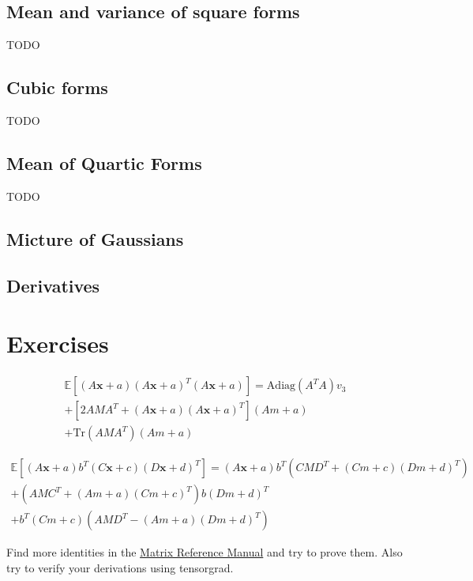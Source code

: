 \subsection{Mean and variance of square forms}
TODO
\subsection{Cubic forms}
TODO
\subsection{Mean of Quartic Forms}
TODO
\subsection{Micture of Gaussians}
\subsection{Derivatives}

\section{Exercises}
\begin{exercise}
   \begin{align*}
   \mathbb{E}[(A\mathbf{x} + a)(A\mathbf{x} + a)^T (A\mathbf{x} + a)] = 
   \text{Adiag}(A^T A) v_3 \\
   + [2 AMA^T + (A\mathbf{x} + a)(A\mathbf{x} + a)^T] (Am + a) \\
   + \text{Tr}(AMA^T)(Am + a)
   \end{align*}

   \begin{align*}
   \mathbb{E}[(A\mathbf{x} + a) b^T (C\mathbf{x} + c)(D\mathbf{x} + d)^T] = 
   (A\mathbf{x} + a) b^T (CMD^T + (Cm + c)(Dm + d)^T) \\
   + (AMC^T + (Am + a)(Cm + c)^T) b(Dm + d)^T \\
   + b^T (Cm + c)(AMD^T - (Am + a)(Dm + d)^T)
   \end{align*}
\end{exercise}
\begin{exercise}
   Find more identities in the \href{http://www.ee.ic.ac.uk/hp/staff/dmb/matrix/expect.html}{Matrix Reference Manual} and try to prove them.
   Also try to verify your derivations using tensorgrad.
\end{exercise}

